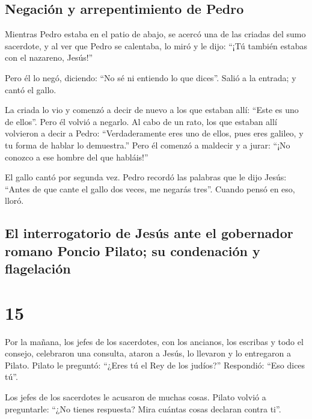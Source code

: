 \hypertarget{negaciuxf3n-y-arrepentimiento-de-pedro}{%
\subsection{Negación y arrepentimiento de
Pedro}\label{negaciuxf3n-y-arrepentimiento-de-pedro}}

 Mientras Pedro estaba en el patio de abajo, se acercó
una de las criadas del sumo sacerdote,  y al ver que
Pedro se calentaba, lo miró y le dijo: ``¡Tú también estabas con el
nazareno, Jesús!''

 Pero él lo negó, diciendo: ``No sé ni entiendo lo que
dices''. Salió a la entrada; y cantó el gallo.

 La criada lo vio y comenzó a decir de nuevo a los que
estaban allí: ``Este es uno de ellos''.  Pero él volvió a
negarlo. Al cabo de un rato, los que estaban allí volvieron a decir a
Pedro: ``Verdaderamente eres uno de ellos, pues eres galileo, y tu forma
de hablar lo demuestra.''  Pero él comenzó a maldecir y a
jurar: ``¡No conozco a ese hombre del que habláis!''

 El gallo cantó por segunda vez. Pedro recordó las
palabras que le dijo Jesús: ``Antes de que cante el gallo dos veces, me
negarás tres''. Cuando pensó en eso, lloró.

\hypertarget{el-interrogatorio-de-jesuxfas-ante-el-gobernador-romano-poncio-pilato-su-condenaciuxf3n-y-flagelaciuxf3n}{%
\subsection{El interrogatorio de Jesús ante el gobernador romano Poncio
Pilato; su condenación y
flagelación}\label{el-interrogatorio-de-jesuxfas-ante-el-gobernador-romano-poncio-pilato-su-condenaciuxf3n-y-flagelaciuxf3n}}

\hypertarget{section-14}{%
\section{15}\label{section-14}}

 Por la mañana, los jefes de los sacerdotes, con los
ancianos, los escribas y todo el consejo, celebraron una consulta,
ataron a Jesús, lo llevaron y lo entregaron a Pilato. 
Pilato le preguntó: ``¿Eres tú el Rey de los judíos?'' Respondió: ``Eso
dices tú''.

 Los jefes de los sacerdotes le acusaron de muchas cosas.
 Pilato volvió a preguntarle: ``¿No tienes respuesta? Mira
cuántas cosas declaran contra ti''.

